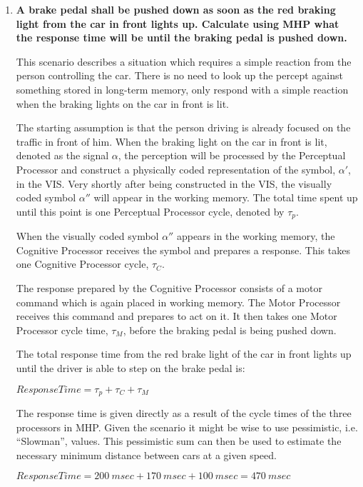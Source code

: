 \begin{enumerate}[label=\alph*)]

\item \textbf{A brake pedal shall be pushed down as soon as the red braking light from the car in front lights up. Calculate using \ac{MHP} what the response time will be until the braking pedal is pushed down.}

This scenario describes a situation which requires a simple reaction from the person controlling the car. There is no need to look up the percept against something stored in long-term memory, only respond with a simple reaction when the braking lights on the car in front is lit.

The starting assumption is that the person driving is already focused on the traffic in front of him. When the braking light on the car in front is lit, denoted as the signal $\alpha$, the perception will be processed by the Perceptual Processor and construct a physically coded representation of the symbol, $\alpha '$, in the \ac{VIS}. Very shortly after being constructed in the \ac{VIS}, the visually coded symbol $\alpha''$ will appear in the working memory. The total time spent up until this point is one Perceptual Processor cycle, denoted by $\tau_p$.

When the visually coded symbol $\alpha''$ appears in the working memory, the Cognitive Processor receives the symbol and prepares a response. This takes one Cognitive Processor cycle, $\tau_C$.

The response prepared by the Cognitive Processor consists of a motor command which is again placed in working memory. The Motor Processor receives this command and prepares to act on it. It then takes one Motor Processor cycle time, $\tau_M$, before the braking pedal is being pushed down.

The total response time from the red brake light of the car in front lights up until the driver is able to step on the brake pedal is:

$\textit{ResponseTime} = \tau_p + \tau_C + \tau_M$

The response time is given directly as a result of the cycle times of the three processors in \ac{MHP}. Given the scenario it might be wise to use pessimistic, i.e. ``Slowman'', values. This pessimistic sum can then be used to estimate the necessary minimum distance between cars at a given speed.

$\textit{ResponseTime} = 200~\textit{msec} + 170~\textit{msec} + 100~\textit{msec} = 470~\textit{msec}$


\end{enumerate}
